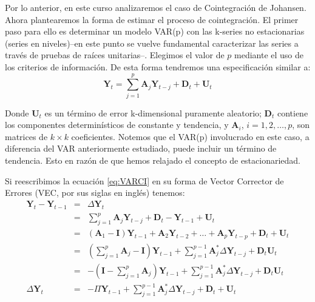 \documentclass[
]{book}
\begin{document}
Por lo anterior, en este curso analizaremos el caso de Cointegración de Johansen. Ahora plantearemos la forma de estimar el proceso de cointegración. El primer paso para ello es determinar un modelo VAR(p) con las k-series no estacionarias (series en niveles)--en este punto se vuelve fundamental caracterizar las series a través de pruebas de raíces unitarias--. Elegimos el valor de \(p\) mediante el uso de los criterios de información. De esta forma tendremos una especificación similar a:
\begin{equation}
    \mathbf{Y}_t = \sum_{j=1}^p \mathbf{A}_j \mathbf{Y}_{t-j} + \mathbf{D}_t + \mathbf{U}_t
    \label{eq:VARCI}
\end{equation}

Donde \(\mathbf{U}_t\) es un término de error k-dimensional puramente aleatorio; \(\mathbf{D}_t\) contiene los componentes determinísticos de constante y tendencia, y \(\mathbf{A}_i\), \(i = 1, 2, \ldots, p\), son matrices de \(k \times k\) coeficientes. Notemos que el VAR(p) involucrado en este caso, a diferencia del VAR anteriormente estudiado, puede incluir un término de tendencia. Esto en razón de que hemos relajado el concepto de estacionariedad.

Si reescribimos la ecuación \eqref{eq:VARCI} en su forma de Vector Corrector de Errores (VEC, por sus siglas en inglés) tenemos:
\begin{eqnarray}
    \mathbf{Y}_t - \mathbf{Y}_{t-1} & = & \Delta \mathbf{Y}_t \nonumber \\
    & = & \sum_{j=1}^p \mathbf{A}_j \mathbf{Y}_{t-j} + \mathbf{D}_t - \mathbf{Y}_{t-1} + \mathbf{U}_t \nonumber \\
    & = & (\mathbf{A}_1 - \mathbf{I}) \mathbf{Y}_{t-1} + \mathbf{A}_2 \mathbf{Y}_{t-2} + \ldots + \mathbf{A}_p \mathbf{Y}_{t-p} + \mathbf{D}_t + \mathbf{U}_t \nonumber \\
    & = & \left( \sum_{j=1}^{p} \mathbf{A}_j - \mathbf{I} \right) \mathbf{Y}_{t-1} + \sum_{j=1}^{p-1} \mathbf{A}^*_j \Delta \mathbf{Y}_{t-j} + \mathbf{D}_t \mathbf{U}_t \nonumber \\
    & = & - \left( \mathbf{I} - \sum_{j=1}^{p} \mathbf{A}_j \right) \mathbf{Y}_{t-1} + \sum_{j=1}^{p-1} \mathbf{A}^*_j \Delta \mathbf{Y}_{t-j} + \mathbf{D}_t \mathbf{U}_t \nonumber \\
    \Delta \mathbf{Y}_t & = & - \Pi \mathbf{Y}_{t-1} + \sum_{j=1}^{p-1} \mathbf{A}^*_j \Delta \mathbf{Y}_{t-j} + \mathbf{D}_t + \mathbf{U}_t
    \label{eq:VARVEC}
\end{eqnarray}
\end{document}
